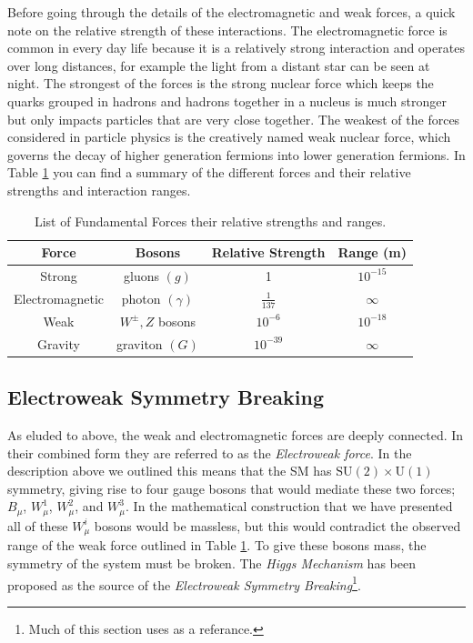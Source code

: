 Before going through the details of the electromagnetic and weak forces, a quick note on the relative strength of these interactions. The electromagnetic force is common in every day life because it is a relatively strong interaction and operates over long distances, for example the light from a distant star can be seen at night. The strongest of the forces is the strong nuclear force which keeps the quarks grouped in hadrons and hadrons together in a nucleus is much stronger but only impacts particles that are very close together. The weakest of the forces considered in particle physics is the creatively named weak nuclear force, which governs the decay of higher generation fermions into lower generation fermions. In Table \ref{tab:Forces} you can find a summary of the different forces and their relative strengths and interaction ranges.

\begin{table}
\begin{center}
\begin{tabular}{c|c|c|c}
\hline 
\hline
Force & Bosons & Relative Strength & Range (m) \\ \hline \hline
Strong & gluons $\left(g\right)$ & 1 & $10^{-15}$ \\
Electromagnetic & photon $\left(\gamma\right)$ & $\frac{1}{137}$ & $\infty$ \\
Weak & $W^{\pm}, Z$ bosons & $10^{-6}$ & $10^{-18}$ \\
Gravity & graviton $\left(G\right)$ & $10^{-39}$ & $\infty$ \\
\hline
\end{tabular}
\end{center}
\caption{List of Fundamental Forces their relative strengths and ranges.}
\label{tab:Forces}
\end{table}

\subsection{Electroweak Symmetry Breaking}
\label{sec:EWsymmetry}
As eluded to above, the weak and electromagnetic forces are deeply connected. In their combined form they are referred to as the \textit{Electroweak force}. In the description above we outlined this means that the SM has $\mathrm{SU}(2) \times \mathrm{U}(1)$ symmetry, giving rise to four gauge bosons that would mediate these two forces; $B_{\mu}$, $W_{\mu}^{1}$, $W_{\mu}^{2}$, and $W_{\mu}^{3}$. In the mathematical construction that we have presented all of these $W_{\mu}^{i}$ bosons would be massless, but this would contradict the observed range of the weak force outlined in Table \ref{tab:Forces}. To give these bosons mass, the symmetry of the system must be broken. The \textit{Higgs Mechanism} \cite{Higgs:1964ia,Higgs:1964pj,Higgs:1966ev,Englert:1964et,Guralnik:1964eu,Kibble:1967sv} has been proposed as the source of the \textit{Electroweak Symmetry Breaking}\footnote{Much of this section uses \cite{Dawson:2008jk} as a referance.}. 

